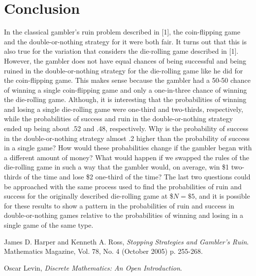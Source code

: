 \documentclass[12pt]{article}
\begin{document}
\section{Conclusion}
In the classical gambler's ruin problem described in [1], the coin-flipping game and the double-or-nothing strategy for it were both fair.  
It turns out that this is also true for the variation that considers the die-rolling game described in [1].  
However, the gambler does not have equal chances of being successful and being ruined in the double-or-nothing strategy for the die-rolling game like he did for the coin-flipping game.  
This makes sense because the gambler had a 50-50 chance of winning a single coin-flipping game and only a one-in-three chance of winning the die-rolling game.
Although, it is interesting that the probabilities of winning and losing a single die-rolling game were one-third and two-thirds, respectively, while the probabilities of success and ruin in the double-or-nothing strategy ended up being about .52 and .48, respectively.
Why is the probability of success in the double-or-nothing strategy almost .2 higher than the probability of success in a single game?
How would these probabilities change if the gambler began with a different amount of money?
What would happen if we swapped the rules of the die-rolling game in such a way that the gambler would, on average, win \$1 two-thirds of the time and lose \$2 one-third of the time?
The last two questions could be approached with the same process used to find the probabilities of ruin and success for the originally described die-rolling game at \$$N=\$5$, and it is possible for these results to show a pattern in the probabilities of ruin and success in double-or-nothing games relative to the probabilities of winning and losing in a single game of the same type.

\newpage

\begin{thebibliography}{9}
James D. Harper and Kenneth A. Ross, 
\textit{Stopping Strategies and Gambler's Ruin}.
Mathematics Magazine, Vol. 78, No. 4 (October 2005) p. 255-268.

Oscar Levin, 
\textit{Discrete Mathematics: An Open Introduction}.
\end{thebibliography}
\end{document}

